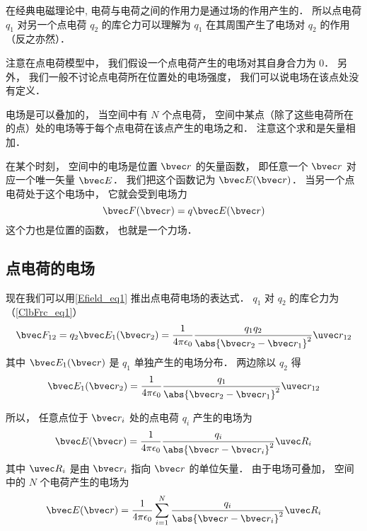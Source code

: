 
在经典电磁理论中, 电荷与电荷之间的作用力是通过场的作用产生的． 所以点电荷 $q_1$ 对另一个点电荷 $q_2$ 的库仑力可以理解为 $q_1$ 在其周围产生了电场对 $q_2$ 的作用（反之亦然）．

注意在点电荷模型中， 我们假设一个点电荷产生的电场对其自身合力为 0． 另外， 我们一般不讨论点电荷所在位置处的电场强度， 我们可以说电场在该点处没有定义．

电场是可以叠加的， 当空间中有 $N$ 个点电荷， 空间中某点（除了这些电荷所在的点）处的电场等于每个点电荷在该点产生的电场之和． 注意这个求和是矢量相加．

在某个时刻， 空间中的电场是位置 $\bvec r$ 的矢量函数， 即任意一个 $\bvec r$ 对应一个唯一矢量 $\bvec E$． 我们把这个函数记为 $\bvec E(\bvec r)$． 当另一个点电荷处于这个电场中， 它就会受到电场力
\begin{equation}\label{Efield_eq1}
\bvec F(\bvec r) = q \bvec E(\bvec r)
\end{equation}
这个力也是位置的函数， 也就是一个力场．
 
\subsection{点电荷的电场}
现在我们可以用\autoref{Efield_eq1} 推出点电荷电场的表达式． $q_1$ 对 $q_2$ 的库仑力为（\autoref{ClbFrc_eq1}）
\begin{equation}\label{Efield_eq3}
\bvec F_{12} = q_2 \bvec E_1(\bvec r_2) = \frac{1}{4\pi\epsilon_0}\frac{q_1 q_2}{\abs{\bvec r_2 - \bvec r_1}^2} \uvec r_{12}
\end{equation}
其中 $\bvec E_1(\bvec r)$ 是 $q_1$ 单独产生的电场分布． 两边除以 $q_2$ 得
\begin{equation}
\bvec E_1(\bvec r_2) = \frac{1}{4\pi\epsilon_0}\frac{q_1}{\abs{\bvec r_2 - \bvec r_1}^2} \uvec r_{12}
\end{equation}

所以， 任意点位于 $\bvec r_i$ 处的点电荷 $q_i$ 产生的电场为
\begin{equation}\label{Efield_eq4}
\bvec E(\bvec r) = \frac{1}{4\pi\epsilon_0}\frac{q_i}{\abs{\bvec r - \bvec r_i}^2} \uvec R_i
\end{equation}
其中 $\uvec R_i$ 是由 $\bvec r_i$ 指向 $\bvec r$ 的单位矢量． 由于电场可叠加， 空间中的 $N$ 个电荷产生的电场为
\begin{equation}\label{Efield_eq2}
\bvec E(\bvec r) = \frac{1}{4\pi\epsilon_0} \sum_{i=1}^N \frac{q_i}{\abs{\bvec r - \bvec r_i}^2} \uvec R_i
\end{equation}

